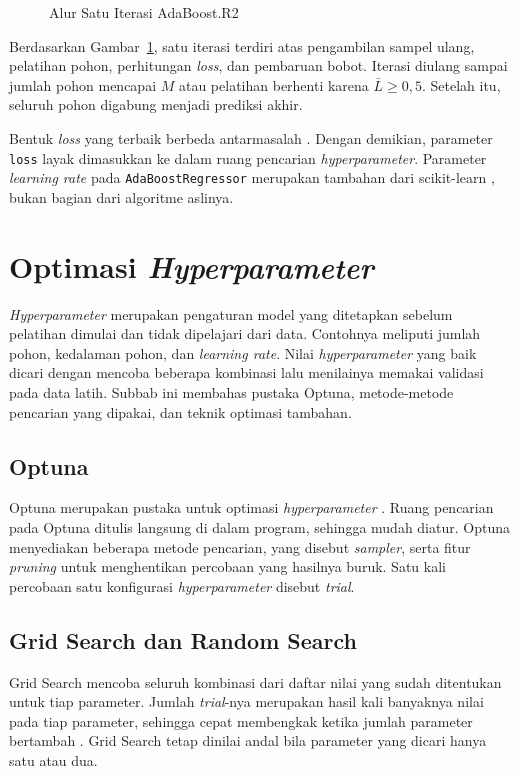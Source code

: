 \begin{figure}[!htbp]
  \centering
  \caption[Alur Satu Iterasi AdaBoost.R2]{Alur Satu Iterasi AdaBoost.R2
    \cite{drucker1997}}
  \label{fig:adaboost}
\end{figure}


Berdasarkan Gambar~\ref{fig:adaboost}, satu iterasi terdiri atas
pengambilan sampel ulang, pelatihan pohon, perhitungan \textit{loss}, dan
pembaruan bobot. Iterasi diulang sampai jumlah pohon mencapai $M$ atau
pelatihan berhenti karena $\bar{L} \ge 0{,}5$. Setelah itu, seluruh pohon
digabung menjadi prediksi akhir.

Bentuk \textit{loss} yang terbaik berbeda antarmasalah \cite{drucker1997}.
Dengan demikian, parameter \texttt{loss} layak dimasukkan ke dalam ruang pencarian
\textit{hyperparameter}. Parameter \textit{learning rate} pada \texttt{AdaBoostRegressor} merupakan tambahan dari scikit-learn \cite{sklearnadaboost}, bukan bagian dari algoritme aslinya.


\section{Optimasi \textit{Hyperparameter}}
\label{sec:optimasi}
\textit{Hyperparameter} merupakan pengaturan model yang ditetapkan sebelum
pelatihan dimulai dan tidak dipelajari dari data. Contohnya meliputi jumlah
pohon, kedalaman pohon, dan \textit{learning rate}. Nilai
\textit{hyperparameter} yang baik dicari dengan mencoba beberapa kombinasi
lalu menilainya memakai validasi pada data latih.
Subbab ini membahas pustaka Optuna, metode-metode pencarian yang dipakai, dan
teknik optimasi tambahan.

\subsection{Optuna}
Optuna merupakan pustaka untuk optimasi \textit{hyperparameter}
\cite{akiba2019}. Ruang pencarian pada Optuna ditulis langsung di dalam
program, sehingga mudah diatur. Optuna menyediakan beberapa metode pencarian,
yang disebut \textit{sampler}, serta fitur \textit{pruning} untuk menghentikan
percobaan yang hasilnya buruk. Satu kali percobaan satu konfigurasi
\textit{hyperparameter} disebut \textit{trial}.

\subsection{Grid Search dan Random Search}
Grid Search mencoba seluruh kombinasi dari daftar nilai yang sudah ditentukan
untuk tiap parameter. Jumlah \textit{trial}-nya merupakan hasil kali banyaknya nilai
pada tiap parameter, sehingga cepat membengkak ketika jumlah parameter
bertambah \cite{bergstra2012}. Grid Search tetap dinilai andal bila parameter
yang dicari hanya satu atau dua.

